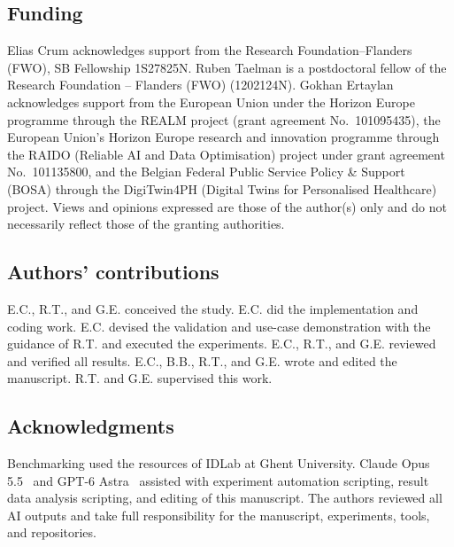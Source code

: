 \documentclass[pdflatex,sn-mathphys-num]{sn-jnl}
\begin{document}
\subsection*{Funding}
Elias Crum acknowledges support from the Research Foundation--Flanders (FWO), SB Fellowship 1S27825N.
Ruben Taelman is a postdoctoral fellow of the Research Foundation -- Flanders (FWO) (1202124N).
Gokhan Ertaylan acknowledges support from the European Union under the Horizon Europe programme through the REALM project (grant agreement No.~101095435), the European Union's Horizon Europe research and innovation programme through the RAIDO (Reliable AI and Data Optimisation) project under grant agreement No.~101135800, and the Belgian Federal Public Service Policy \& Support (BOSA) through the DigiTwin4PH (Digital Twins for Personalised Healthcare) project.
Views and opinions expressed are those of the author(s) only and do not necessarily reflect those of the granting authorities.

\subsection*{Authors' contributions}
E.C., R.T., and G.E. conceived the study.
E.C. did the implementation and coding work.
E.C. devised the validation and use-case demonstration with the guidance of R.T. and executed the experiments.
E.C., R.T., and G.E. reviewed and verified all results.
E.C., B.B., R.T., and G.E. wrote and edited the manuscript.
R.T. and G.E. supervised this work.

\subsection*{Acknowledgments}
Benchmarking used the resources of IDLab at Ghent University.
Claude Opus 5.5~\cite{anthropic2026claudeopus55} and GPT-6 Astra~\cite{openai2026gpt6astra} assisted with experiment automation scripting, result data analysis scripting, and editing of this manuscript.
The authors reviewed all AI outputs and take full responsibility for the manuscript, experiments, tools, and repositories.


\clearpage

\end{document}
